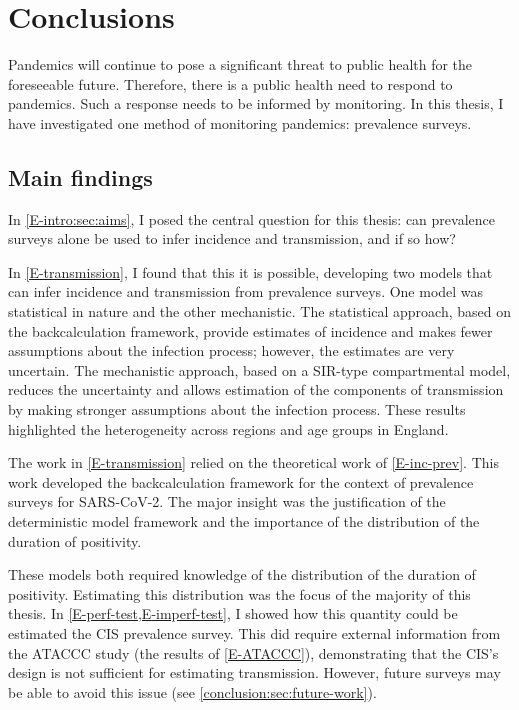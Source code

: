\documentclass[thesis.tex]{subfiles}
\begin{document}
\ifSubfilesClassLoaded{
    \setcounter{chapter}{7}
}

\chapter{Conclusions} \label{conclusion}

Pandemics will continue to pose a significant threat to public health for the foreseeable future.
Therefore, there is a public health need to respond to pandemics.
Such a response needs to be informed by monitoring.
In this thesis, I have investigated one method of monitoring pandemics: prevalence surveys.

\section{Main findings}

In \cref{E-intro:sec:aims}, I posed the central question for this thesis: can prevalence surveys alone be used to infer incidence and transmission, and if so how?

In \cref{E-transmission}, I found that this it is possible, developing two models that can infer incidence and transmission from prevalence surveys.
One model was statistical in nature and the other mechanistic.
The statistical approach, based on the backcalculation framework, provide estimates of incidence and makes fewer assumptions about the infection process; however, the estimates are very uncertain.
The mechanistic approach, based on a SIR-type compartmental model, reduces the uncertainty and allows estimation of the components of transmission by making stronger assumptions about the infection process.
These results highlighted the heterogeneity across regions and age groups in England.

The work in \cref{E-transmission} relied on the theoretical work of \cref{E-inc-prev}.
This work developed the backcalculation framework for the context of prevalence surveys for SARS-CoV-2.
The major insight was the justification of the deterministic model framework and the importance of the distribution of the duration of positivity.

These models both required knowledge of the distribution of the duration of positivity.
Estimating this distribution was the focus of the majority of this thesis.
In \cref{E-perf-test,E-imperf-test}, I showed how this quantity could be estimated the CIS prevalence survey.
This did require external information from the ATACCC study (the results of \cref{E-ATACCC}), demonstrating that the CIS's design is not sufficient for estimating transmission.
However, future surveys may be able to avoid this issue (see \cref{conclusion:sec:future-work}).
\end{document}
